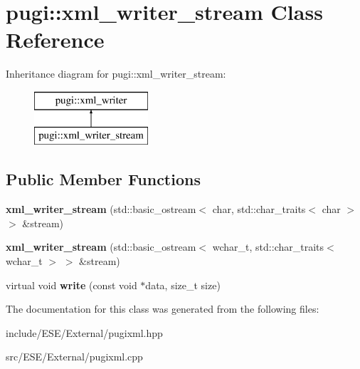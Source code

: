 \hypertarget{classpugi_1_1xml__writer__stream}{\section{pugi\-:\-:xml\-\_\-writer\-\_\-stream Class Reference}
\label{classpugi_1_1xml__writer__stream}
}
Inheritance diagram for pugi\-:\-:xml\-\_\-writer\-\_\-stream\-:\begin{figure}[H]
\begin{center}
\leavevmode
\includegraphics[height=2.000000cm]{classpugi_1_1xml__writer__stream}
\end{center}
\end{figure}
\subsection*{Public Member Functions}
\begin{DoxyCompactItemize}
\item 
\hypertarget{classpugi_1_1xml__writer__stream_a259c28368c08378e15cf28b35a1dcd9a}{{\bfseries xml\-\_\-writer\-\_\-stream} (std\-::basic\-\_\-ostream$<$ char, std\-::char\-\_\-traits$<$ char $>$ $>$ \&stream)}\label{classpugi_1_1xml__writer__stream_a259c28368c08378e15cf28b35a1dcd9a}

\item 
\hypertarget{classpugi_1_1xml__writer__stream_afa342cf0bb3a0bd6ee3d47550ad23333}{{\bfseries xml\-\_\-writer\-\_\-stream} (std\-::basic\-\_\-ostream$<$ wchar\-\_\-t, std\-::char\-\_\-traits$<$ wchar\-\_\-t $>$ $>$ \&stream)}\label{classpugi_1_1xml__writer__stream_afa342cf0bb3a0bd6ee3d47550ad23333}

\item 
\hypertarget{classpugi_1_1xml__writer__stream_a3ec185992d56341f6ee8d1037a6efb17}{virtual void {\bfseries write} (const void $\ast$data, size\-\_\-t size)}\label{classpugi_1_1xml__writer__stream_a3ec185992d56341f6ee8d1037a6efb17}

\end{DoxyCompactItemize}


The documentation for this class was generated from the following files\-:\begin{DoxyCompactItemize}
\item 
include/\-E\-S\-E/\-External/pugixml.\-hpp\item 
src/\-E\-S\-E/\-External/pugixml.\-cpp\end{DoxyCompactItemize}
